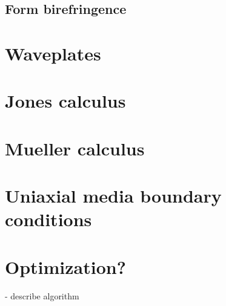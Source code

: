 \subsection{Form birefringence}

\section{Waveplates}

\section{Jones calculus}

\section{Mueller calculus}

\section{Uniaxial media boundary conditions}

\section{Optimization?}
- describe algorithm
